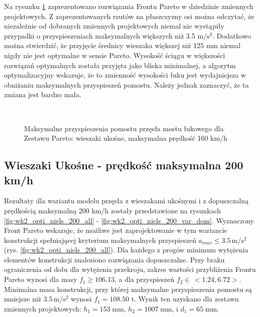 Na rysunku \ref{fig:wk2_opti_niels_160_var_dom} zaprezentowano rozwiązania Frontu Pareto w dziedzinie zmiennych projektowych. Z zaprezentowanych rzutów na płaszczyzny osi można odczytać, że niezależnie od dobranych zmiennych projektowych niemal nie wystąpiły przypadki o przyspieszeniach maksymalnych większych niż 3.5 $\mathrm{m/s^2}$. Dodatkowo można stwierdzić, że przyjęcie średnicy wieszaka większej niż 125 mm niemal nigdy nie jest optymalne w sensie Pareto. Wysokość ściągu w większości rozwiązań optymalnych została przyjęta jako bliska minimalnej, a algorytm optymalizacyjny wskazuje, że to zmienność wysokości łuku jest wydajniejsza w obniżaniu maksymalnych przyspieszeń pomostu. Należy jednak zaznaczyć, że ta zmiana jest bardzo mała. 

\begin{figure}[hbt!]
	\centering
	\\
	\captionsetup{justification=centering}
	\caption{Maksymalne przyspieszenia pomostu przęsła mostu łukowego dla Zestawu Pareto: wieszaki ukośne, maksymalna prędkość 160 km/h}
	\label{fig:wk2_opti_niels_160_var_dom}
\end{figure}









\pagebreak[4]
\subsection{Wieszaki Ukośne - prędkość maksymalna 200 km/h}

Rezultaty dla wariantu modelu przęsła z wieszakami ukośnymi i z dopuszczalną prędkością maksymalną 200 km/h zostały przedstawione na rysunkach \ref{fig:wk2_opti_niels_200_all} - \ref{fig:wk2_opti_niels_200_var_dom}. Wyznaczony Front Pareto wskazuje, że możliwe jest zaprojektowanie w tym wariancie konstrukcji spełniającej kryterium maksymalnych przyspieszeń $a_{max}\le 3.5\,\mathrm{m/s^2}$ (rys. \ref{fig:wk2_opti_niels_200_all}). Dla każdego z progów minimum wytężenia elementów konstrukcji znaleziono rozwiązania dopuszczalne. Przy braku ograniczenia od dołu dla wytężenia przekroju, zakres wartości przybliżenia Frontu Pareto wynosi dla masy $f_1 \ge 106.13$, a dla przyspieszeń $f_2 \in\,<1.24,6.72>$. Minimalna masa konstrukcji, przy której maksymalne przyspieszenia pomostu są mniejsze niż $3.5\,\mathrm{m/s^2}$ wynosi $f_1 = 108.50$ t. Wynik ten uzyskano dla zestawu zmiennych projektowych: $h_1 = 153\;\mathrm{mm}$, $h_2 = 1007\;\mathrm{mm}$, i $d_1 = 65\;\mathrm{mm}$.


